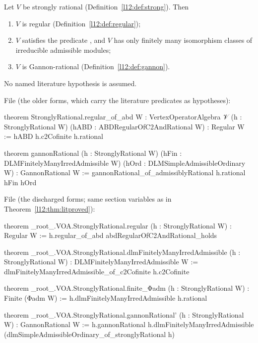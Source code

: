 \begin{theorem}\label{l12:thm:srlit}
Let $V$ be strongly rational (Definition~\ref{l12:def:strong}). Then
\begin{enumerate}
\item $V$ is regular (Definition~\ref{l12:def:regular});
\item $V$ satisfies the predicate , and $V$ has only finitely many isomorphism classes
  of irreducible admissible modules;
\item $V$ is Gannon-rational (Definition~\ref{l12:def:gannon}).
\end{enumerate}
No named literature hypothesis is assumed.
\end{theorem}
\noindent File  (the older forms, which carry the
literature predicates as hypotheses):
\begin{leancode}
theorem StronglyRational.regular_of_abd {W : VertexOperatorAlgebra 𝒱} (h : StronglyRational W)
    (hABD : ABDRegularOfC2AndRational W) : Regular W :=
  hABD h.c2Cofinite h.rational

theorem gannonRational (h : StronglyRational W) (hFin : DLMFinitelyManyIrredAdmissible W)
    (hOrd : DLMSimpleAdmissibleOrdinary W) : GannonRational W :=
  gannonRational_of_admissiblyRational h.rational hFin hOrd
\end{leancode}
\noindent File  (the
discharged forms; same section variables as in Theorem~\ref{l12:thm:litproved}):
\begin{leancode}
theorem _root_.VOA.StronglyRational.regular (h : StronglyRational W) : Regular W :=
  h.regular_of_abd abdRegularOfC2AndRational_holds

theorem _root_.VOA.StronglyRational.dlmFinitelyManyIrredAdmissible (h : StronglyRational W) :
    DLMFinitelyManyIrredAdmissible W :=
  dlmFinitelyManyIrredAdmissible_of_c2Cofinite h.c2Cofinite

theorem _root_.VOA.StronglyRational.finite_Φadm (h : StronglyRational W) : Finite (Φadm W) :=
  h.dlmFinitelyManyIrredAdmissible h.rational

theorem _root_.VOA.StronglyRational.gannonRational' (h : StronglyRational W) :
    GannonRational W :=
  h.gannonRational h.dlmFinitelyManyIrredAdmissible
    (dlmSimpleAdmissibleOrdinary_of_stronglyRational h)
\end{leancode}

